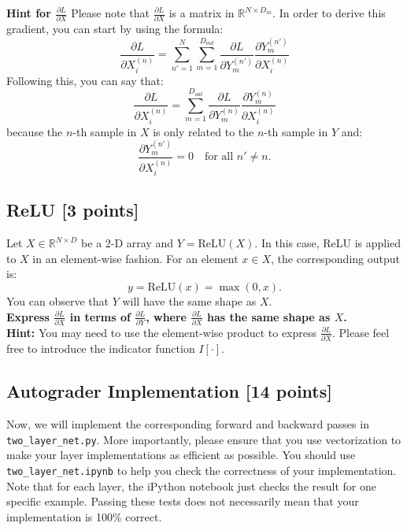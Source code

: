 \documentclass[lang=cn,11pt]{elegantbook}
\begin{document}
\textbf{Hint for \( \frac{\partial L}{\partial X} \)}
Please note that \( \frac{\partial L}{\partial X} \) is a matrix in \( \mathbb{R}^{N \times D_{in}} \). In order to derive this gradient, you can start by using the formula: \[
\frac{\partial L}{\partial X_i^{(n)}} = \sum_{n'=1}^{N} \sum_{m=1}^{D_{out}} \frac{\partial L}{\partial Y_m^{(n')}} \frac{\partial Y_m^{(n')}}{\partial X_i^{(n)}}
\]
Following this, you can say that: \[
\frac{\partial L}{\partial X_i^{(n)}} = \sum_{m=1}^{D_{out}} \frac{\partial L}{\partial Y_m^{(n)}} \frac{\partial Y_m^{(n)}}{\partial X_i^{(n)}}
\]
because the \( n \)-th sample in \( X \) is only related to the \( n \)-th sample in \( Y \) and: \[
\frac{\partial Y_m^{(n')}}{\partial X_i^{(n)}} = 0 \quad \text{for all } n' \neq n.
\]

\subsection{ReLU [3 points]}

Let \( X \in \mathbb{R}^{N \times D} \) be a 2-D array and \( Y = \text{ReLU}(X) \). In this case, ReLU is applied to \( X \) in an element-wise fashion. For an element \( x \in X \), the corresponding output is: \[
y = \text{ReLU}(x) = \max(0, x).
\]
You can observe that \( Y \) will have the same shape as \( X \).\\
\textbf{Express \( \frac{\partial L}{\partial X} \) in terms of \( \frac{\partial L}{\partial Y} \), where \( \frac{\partial L}{\partial X} \) has the same shape as \( X \).\\}
\textbf{Hint:} You may need to use the element-wise product to express \( \frac{\partial L}{\partial X} \). Please feel free to introduce the indicator function \( I[\cdot] \).



\subsection{Autograder Implementation [14 points]}

Now, we will implement the corresponding forward and backward passes in \texttt{two\_layer\_net.py}. More importantly, please ensure that you use vectorization to make your layer implementations as efficient as possible. You should use \texttt{two\_layer\_net.ipynb} to help you check the correctness of your implementation. Note that for each layer, the iPython notebook just checks the result for one specific example. Passing these tests does not necessarily mean that your implementation is 100\% correct.
\end{document}
